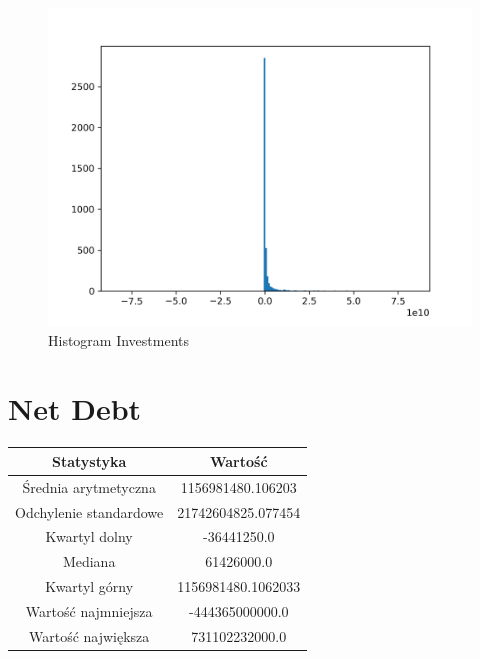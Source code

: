 \documentclass{article}
\begin{document}
\begin{figure}[h!]
    \includegraphics[width=\linewidth]{variables/Investments.png}
    \caption{Histogram Investments }
\end{figure}\section{ Net Debt }

\begin{center}
    \begin{tabular}{|c | c|} 
    \hline
    Statystyka & Wartość \\
    \hline\hline
    Średnia arytmetyczna & 1156981480.106203 \\ 
    \hline
    Odchylenie standardowe & 21742604825.077454 \\
    \hline
    Kwartyl dolny & -36441250.0 \\
    \hline
    Mediana & 61426000.0 \\
    \hline
    Kwartyl górny & 1156981480.1062033 \\
    \hline
    Wartość najmniejsza & -444365000000.0 \\
    \hline
    Wartość największa & 731102232000.0 \\
    \hline
   \end{tabular}
\end{center}
\end{document}
